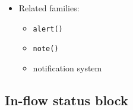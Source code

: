 \begin{itemize}
  \begin{itemize}
  \tightlist
  \item
    rich/static: keep compact label styling inline with nearby content
  \item
    pipe: lower to plain inline text label without relying on color
  \item
    accessible: speak the status in plain words next to the owning object
  \end{itemize}
\item
  Related families:

  \begin{itemize}
  \tightlist
  \item
    \texttt{a\allowbreak{}l\allowbreak{}e\allowbreak{}r\allowbreak{}t\allowbreak{}(\allowbreak{})}
  \item
    \texttt{n\allowbreak{}o\allowbreak{}t\allowbreak{}e\allowbreak{}(\allowbreak{})}
  \item
    notification system
  \end{itemize}
\end{itemize}

\subsection{In-flow status block}\label{record-019-in-flow-status-block}

